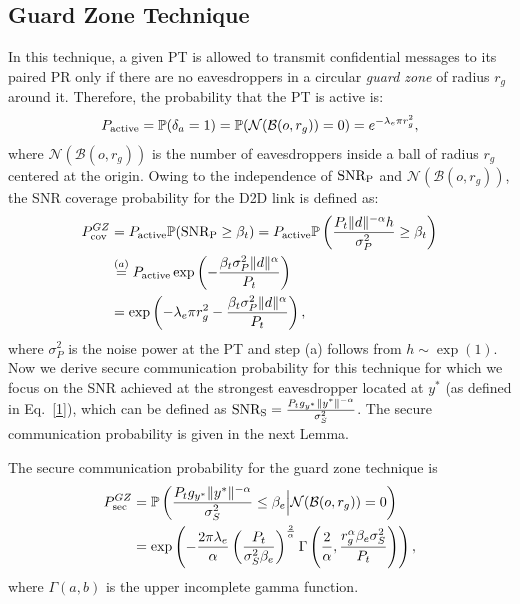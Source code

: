 \documentclass[final]{IEEEtran}
\begin{document}
\subsection{Guard Zone Technique}
In this technique, a given PT is allowed to transmit confidential messages to its paired PR only if there are no eavesdroppers in a circular {\em guard zone} of radius $r_g$ around it. Therefore, the probability that the PT is active is: 
\begin{align}
\label{2}
P_{\rm active}=\mathbb{P}(\delta_a=1)=\mathbb{P}(\mathcal{N}(\mathcal{B}(o,r_g))=0)=e^{-\lambda_e\pi r_g^2},
\end{align}
where $\mathcal{N}(\mathcal{B}(o,r_g))$ is the number of eavesdroppers inside a ball of radius $r_g$ centered at the origin. Owing to the independence of ${\rm SNR_P}$ and $\mathcal{N}(\mathcal{B}(o,r_g))$, the SNR coverage probability for the D2D link is defined as: 
\begin{align}
\label{3}
P_{\rm cov}^{GZ}&=P_{\rm active}\mathbb{P}({\rm SNR_{P}}\geq\beta_t)=P_{\rm active}\mathbb{P}\left(\frac{P_t\|d\|^{-\alpha}h}{\sigma_P^2}\geq\beta_t\right)\nonumber\\
&\stackrel{(a)}{=}P_{\rm active}\exp\left(-\frac{\beta_t\sigma^2_P\|d\|^{\alpha}}{P_t}\right)\nonumber\\
&=\exp\left(-\lambda_e\pi r_g^2-\frac{\beta_t\sigma^2_P\|d\|^{\alpha}}{P_t}\right),
\end{align}
where $\sigma_P^2$ is the noise power at the PT and step (a) follows from $h\sim \exp(1)$. Now we derive secure communication probability for this technique for which we focus on the SNR achieved at the strongest eavesdropper located at $y^{*}$ (as defined in Eq.~\ref{1}), which can be defined as ${\rm SNR_S}=\frac{P_tg_{y^{*}}\|y^{*}\|^{-\alpha}}{\sigma_S^2}$. The secure communication probability is given in the next Lemma.
\begin{lemma}\label{lem:1}
The secure communication probability for the guard zone technique is
\begin{align}
\label{4}
P_{\rm sec}^{GZ}&=\mathbb{P}\left(\frac{P_tg_{y^{*}}\|y^{*}\|^{-\alpha}}{\sigma_S^2}\leq\beta_e\Big|\mathcal{N}(\mathcal{B}(o,r_g))=0\right)\nonumber\\
&=\exp\left(-\frac{2\pi\lambda_e}{\alpha}\left(\frac{P_{t}}{\sigma_S^2\beta_e}\right)^{\frac{2}{\alpha}}\Gamma\left(\frac{2}{\alpha},\frac{r_g^{\alpha}\beta_e\sigma_S^2}{P_{t}}\right)\right),
\end{align}
where $\Gamma(a,b)$ is the upper incomplete gamma function.
\end{lemma}
\end{document}
